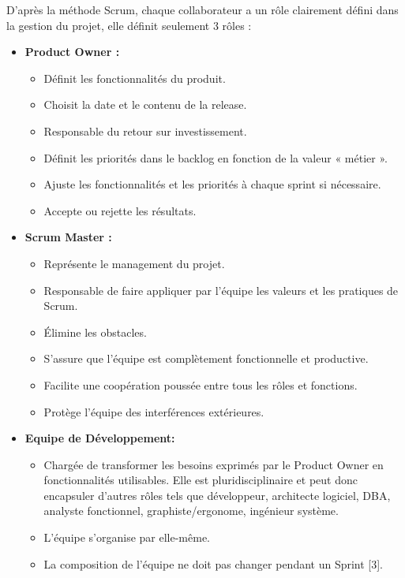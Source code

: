     D’après la méthode Scrum, chaque collaborateur a un rôle clairement défini dans la gestion du projet, elle définit seulement 3 rôles :
    \begin{itemize}
       
  
    \item [$-$] \textbf{Product Owner : }
    \begin{itemize}[label=\textbullet]
    \item Définit les fonctionnalités du produit.
    \item Choisit la date et le contenu de la release.
    \item Responsable du retour sur investissement.
    \item Définit les priorités dans le backlog en fonction de la valeur « métier ».
    \item Ajuste les fonctionnalités et les priorités à chaque sprint si nécessaire.
    \item Accepte ou rejette les résultats.
    \end{itemize}

    \item [$-$]\textbf{Scrum Master : }
     \begin{itemize}[label=\textbullet]
    \item Représente le management du projet.
    \item Responsable de faire appliquer par l’équipe les valeurs et les pratiques de Scrum.
    \item Élimine les obstacles.
    \item S’assure que l’équipe est complètement fonctionnelle et productive.
    \item Facilite une coopération poussée entre tous les rôles et fonctions.
    \item Protège l’équipe des interférences extérieures.
    \end{itemize}

  \item [$-$] \textbf{Equipe de Développement: }
     \begin{itemize}[label=\textbullet,font=\normalsize]
    \item Chargée de transformer les besoins exprimés par le Product Owner en fonctionnalités utilisables. Elle est pluridisciplinaire et peut donc encapsuler d’autres rôles tels que développeur, architecte logiciel, DBA, analyste fonctionnel, graphiste/ergonome, ingénieur système.
    \item L’équipe s’organise par elle-même.
    \item La composition de l’équipe ne doit pas changer pendant un Sprint [3].
    \end{itemize}
  \end{itemize}
